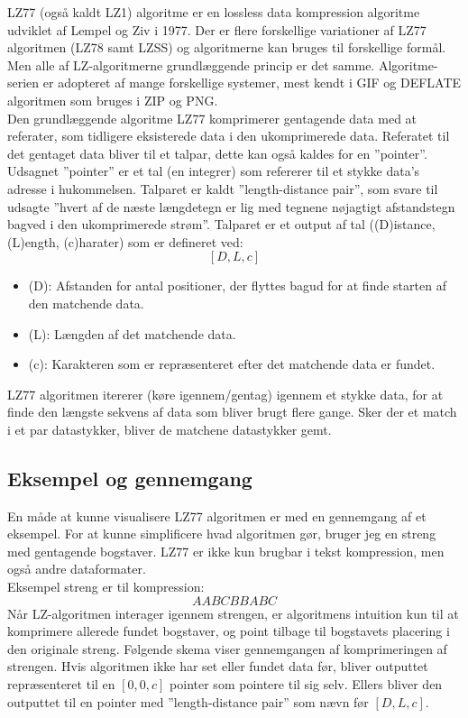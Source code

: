 \documentclass[12pt]{article}
\begin{document}
LZ77 (også kaldt LZ1) algoritme er en lossless data kompression algoritme udviklet af Lempel og Ziv i 1977. 
Der er flere forskellige variationer af LZ77 algoritmen (LZ78 samt LZSS) og algoritmerne kan bruges til forskellige formål. Men alle af LZ-algoritmerne grundlæggende princip er det samme. 
Algoritme-serien er adopteret af mange forskellige systemer, mest kendt i GIF og DEFLATE algoritmen som bruges i ZIP og PNG.\cite*{Wiki/LZ77}\\\newline
Den grundlæggende algoritme LZ77 komprimerer gentagende data med at referater, som tidligere eksisterede data i den ukomprimerede data. Referatet til det gentaget data bliver til et talpar, 
dette kan også kaldes for en ”pointer”. Udsagnet ”pointer” er et tal (en integrer) som refererer til et stykke data’s adresse i hukommelsen. 
Talparet er kaldt ”length-distance pair”, som svare til udsagte ”hvert af de næste længdetegn er lig med tegnene nøjagtigt afstandstegn bagved i den ukomprimerede strøm”. 
Talparet er et output af tal (\boldmath(D)istance, \boldmath(L)ength, \boldmath(c)harater) som er defineret ved:
\[[D,L,c]\] 
\begin{itemize}
  \item \boldmath(D): Afstanden for antal positioner, der flyttes bagud for at finde starten af den matchende data.
  \item \boldmath(L): Længden af det matchende data.
  \item \boldmath(c): Karakteren som er repræsenteret efter det matchende data er fundet.
\end{itemize}
LZ77 algoritmen itererer (køre igennem/gentag) igennem et stykke data, for at finde den længste sekvens af data som bliver brugt flere gange. Sker der et match i et par datastykker, 
bliver de matchene datastykker gemt.

\subsection{Eksempel og gennemgang}
En måde at kunne visualisere LZ77 algoritmen er med en gennemgang af et eksempel. For at kunne simplificere hvad algoritmen gør, bruger jeg en streng med gentagende bogstaver. 
LZ77 er ikke kun brugbar i tekst kompression, men også andre dataformater.\cite{yt/LZ77}\\
Eksempel streng er til kompression:\\
\[AABCBBABC\]
Når LZ-algoritmen interager igennem strengen, er algoritmens intuition kun til at komprimere allerede fundet bogstaver, 
og point tilbage til bogstavets placering i den originale streng. 
Følgende skema viser gennemgangen af komprimeringen af strengen. Hvis algoritmen ikke har set eller fundet data før, bliver outputtet repræsenteret til en \([0,0,c]\) 
pointer som pointere til sig selv. Ellers bliver den outputtet til en pointer med ”length-distance pair” som nævn før \([D,L,c]\).
\end{document}
